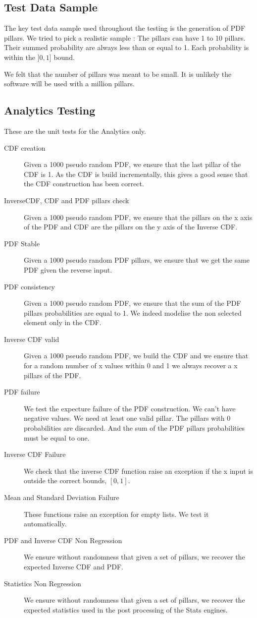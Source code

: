 \documentclass[12pt,a4paper,titlepage]{article}
\begin{document}
\subsection{Test Data Sample}

The key test data sample used throughout the testing 
is the generation of PDF pillars.
We tried to pick a realistic sample :
The pillars can have 1 to 10 pillars. Their summed probability are always less 
than or equal to 1.  Each probability is within the $]0, 1]$ bound.

We felt that the number of pillars was meant to be small. It is unlikely
the software will be used with a million pillars. 

\subsection{Analytics Testing} 
These are the unit tests for the Analytics only.
\begin{description}
	\item [CDF creation]
		Given a 1000 pseudo random PDF, we ensure 
		that the last pillar of the CDF is 1.
		As the CDF is build incrementally, this gives a good sense that
		the CDF construction has been correct.
	\item [InverseCDF, CDF and PDF pillars check]
		Given a 1000 pseudo random PDF, we ensure that
		the pillars on the x axis of the PDF and CDF are the pillars on the y
		axis of the Inverse CDF.
	\item [PDF Stable]
		Given a 1000 pseudo random PDF pillars, 
		we ensure that we get the same PDF given the reverse input.
	\item [PDF consistency]
		Given a 1000 pseudo random PDF, 
		we ensure that the sum of the PDF pillars probabilities are 
		equal to 1. We indeed modelise the non selected element
		only in the CDF.
	\item [Inverse CDF valid]
		Given a 1000 pseudo random PDF,
		we build the CDF and we ensure that for a random number of
		x values within 0 and 1 we always recover a x pillars of the PDF.
	\item [PDF failure]
		We test the expecture failure of the PDF construction. 
		We can't have negative values. We need at least one valid pillar.
		The pillars with 0 probabilities are discarded.
		And the sum of the PDF pillars probabilities must be 
		equal to one.
	\item [Inverse CDF Failure]
		We check that the inverse CDF function raise an
		exception if the x input is outside the correct bounds, 
		$\left[0, 1\right]$.
	\item [Mean and Standard Deviation Failure]
		These functions raise an exception for empty lists.
		We test it automatically.
	\item [PDF and Inverse CDF Non Regression]
		We ensure without randomness that given a set of pillars,
		we recover the expected Inverse CDF and PDF.
	\item [Statistics Non Regression]
		We ensure without randomness that given a set of pillars,
		we recover the expected statistics used in the post processing
		of the Stats engines.
\end{description}
\end{document}
